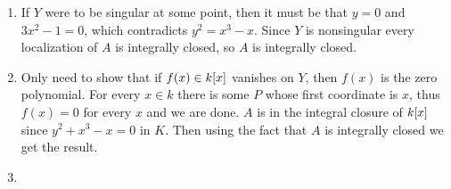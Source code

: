 \documentclass{note}
\begin{document}
\Ex
\begin{enumerate}
  \item If $Y$ were to be singular at some point, then it must be that $y = 0$ and
        $3x^2-1 = 0$, which contradicts $y^2 = x^3 - x$. Since $Y$ is nonsingular every
        localization of $A$ is integrally closed, so $A$ is integrally closed.
  \item Only need to show that if $f(x) \in \polynomials{k}{x}$ vanishes on $Y$, then
        $f(x)$ is the zero polynomial. For every $x\in k$ there is some $P$ whose first
        coordinate is $x$, thus $f(x) = 0$ for every $x$ and we are done. $A$ is in the
        integral closure of $\polynomials{k}{x}$ since $y^2 + x^3 - x = 0$ in $K$. Then
        using the fact that $A$ is integrally closed we get the result.
  \item
\end{enumerate}
\end{document}
